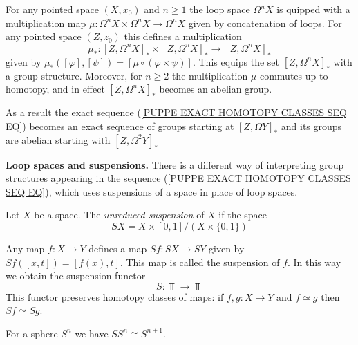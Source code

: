 \begin{note}
\label{LOOP SPACE TO GROUP STRUCTURE NOTE}
For any pointed space $(X, x_{0})$ and $n\geq 1$ the loop space $\Omega^{n} X$ 
is quipped with a multiplication map 
$\mu\colon \Omega^{n} X \times \Omega^{n} X \to \Omega^{n} X$
given by concatenation of loops. 
For any pointed space $(Z, z_{0})$ this defines a multiplication 
\[
\mu_{\ast}\colon [Z, \Omega^{n} X]_{\ast} \times [Z, \Omega^{n} X]_{\ast} 
\to [Z, \Omega^{n} X]_{\ast}
\]
given by $\mu_{\ast}([\varphi], [\psi]) = [\mu\circ (\varphi\times \psi)]$.
This equips the set $[Z, \Omega^{n} X]_{\ast}$ with a group structure.
Moreover, for $n\geq 2$ the multiplication $\mu$ commutes up to homotopy, 
and in effect $[Z, \Omega^{n} X]_{\ast}$ becomes an abelian group.

As a result the exact sequence (\ref{PUPPE EXACT HOMOTOPY CLASSES SEQ EQ})
becomes an exact sequence of groups starting at $[Z, \Omega Y]_{\ast}$
and its groups are abelian starting with $[Z, \Omega^{2} Y]_{\ast}$
\end{note}




\begin{nn}{\bf Loop spaces and suspensions.} There is a different way of interpreting 
group structures appearing in the sequence (\ref{PUPPE EXACT HOMOTOPY CLASSES SEQ EQ}), 
which uses suspensions of a space in place of loop spaces.
\end{nn}




\begin{definition}
Let $X$ be a space. The \emph{unreduced suspension} of $X$ if the space
\[
SX = X \times [0, 1]/(X\times \{0, 1\})
\]
\end{definition}





\begin{note}
Any map $f\colon X \to Y$ defines a map $Sf\colon SX \to SY$ given by $Sf([x, t]) = [f(x), t]$. 
This map is called the suspension of $f$. In this way we obtain the suspension functor
\[
S \colon \Top \to \Top
\]
This functor preserves homotopy classes of maps: if $f, g\colon X \to Y$ and $f\simeq g$
then $Sf \simeq Sg$. 
\end{note}

\begin{example}
For a sphere $S^{n}$ we have $SS^{n} \cong S^{n+1}$. 
\end{example}


